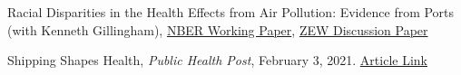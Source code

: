 
\begin{pubitems} %
    \item {Racial Disparities in the Health Effects from Air Pollution: Evidence from Ports (with Kenneth Gillingham), \href{https://www.nber.org/papers/w29108}{NBER Working Paper}, \href{https://www.zew.de/publikationen/racial-disparities-in-the-health-effects-from-air-pollution-evidence-from-ports}{ZEW Discussion Paper}}
\end{pubitems}




\begin{pubitems} %
    \item {Shipping Shapes Health, \textit{Public Health Post}, February 3, 2021. \href{https://www.publichealthpost.org/research/shipping-shapes-health/}{Article Link}}
\end{pubitems}

